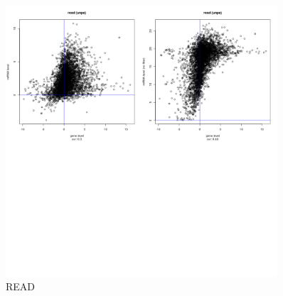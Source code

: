 \documentclass[a4paper,12pt]{article}
\begin{document}
\newpage

\begin{figure}[!h] 
\centering 
\includegraphics[width=0.9\textwidth]{plots/gene_vs_mirna_level_gsa_read.png} 
\caption{READ} 
\end{figure} 



\clearpage








% 
% 
% 
% 
\end{document}
